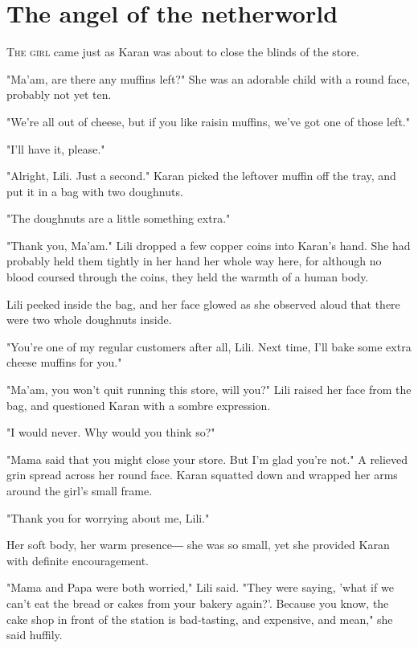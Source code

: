 
\chapter{The angel of the netherworld}


\lettrine{T}{he girl} came just as Karan was about to close the blinds of the store.

"Ma'am, are there any muffins left?" She was an adorable child with a
round face, probably not yet ten.

"We're all out of cheese, but if you like raisin muffins, we've got one
of those left."

"I'll have it, please."

"Alright, Lili. Just a second." Karan picked the leftover muffin off the
tray, and put it in a bag with two doughnuts.

"The doughnuts are a little something extra."

"Thank you, Ma'am." Lili dropped a few copper coins into Karan's hand.
She had probably held them tightly in her hand her whole way here, for
although no blood coursed through the coins, they held the warmth of a
human body.

Lili peeked inside the bag, and her face glowed as she observed aloud
that there were two whole doughnuts inside.

"You're one of my regular customers after all, Lili. Next time, I'll
bake some extra cheese muffins for you."

"Ma'am, you won't quit running this store, will you?" Lili raised her
face from the bag, and questioned Karan with a sombre expression.

"I would never. Why would you think so?"

"Mama said that you might close your store. But I'm glad you're not." A
relieved grin spread across her round face. Karan squatted down and
wrapped her arms around the girl's small frame.

"Thank you for worrying about me, Lili."

Her soft body, her warm presence― she was so small, yet she provided
Karan with definite encouragement.

"Mama and Papa were both worried," Lili said. "They were saying, 'what
if we can't eat the bread or cakes from your bakery again?'. Because you
know, the cake shop in front of the station is bad-tasting, and
expensive, and mean," she said huffily.

